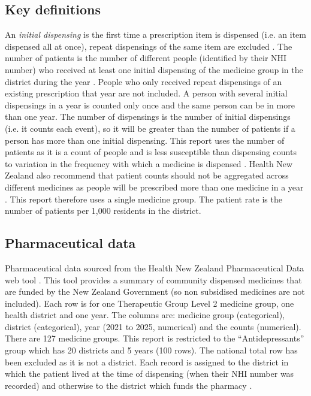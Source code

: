 \documentclass[11pt,a4paper]{article}
\begin{document}
\subsection{Key definitions}
An \emph{initial dispensing}  is the first time a prescription item is dispensed (i.e. an item dispensed all at once), repeat dispensings of the same item are excluded \cite{hnz}. The number of patients is the number of different people (identified by their NHI number) who received at least one initial dispensing of the medicine group in the district during the year \cite{hnz}. People who only received repeat dispensings of an existing prescription that year are not included. A person with several initial dispensings in a year is counted only once and the same person can be in more than one year. The number of dispensings is the number of initial dispensings (i.e. it counts each event), so it will be greater than the number of patients if a person has more than one initial dispensing. This report uses the number of patients as it is a count of people and is less susceptible than dispensing counts to variation in the frequency with which a medicine is dispensed \cite{hnz}. Health New Zealand also recommend that patient counts should not be aggregated across different medicines as people will be prescribed more than one medicine in a year \cite{hnz}. This report therefore uses a single medicine group. The patient rate is the number of patients per 1,000 residents in the district.

\subsection{Pharmaceutical data}
Pharmaceutical data sourced from the Health New Zealand Pharmaceutical Data web tool \cite{hnz}. This tool provides a summary of community dispensed medicines that are funded by the New Zealand Government (so non subsidised medicines are not included). Each row is for one Therapeutic Group Level 2 medicine group, one health district and one year. The columns are: medicine group (categorical), district (categorical), year (2021 to 2025, numerical) and the counts (numerical). There are 127 medicine groups. This report is restricted to the “Antidepressants” group which has 20 districts and 5 years (100 rows). The national total row has been excluded as it is not a district. Each record is assigned to the district in which the patient lived at the time of dispensing (when their NHI number was recorded) and otherwise to the district which funds the pharmacy \cite{hnz}.  
\end{document}
